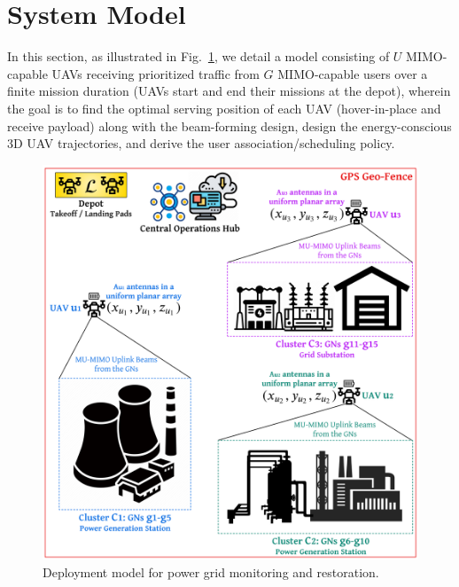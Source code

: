 \documentclass[10pt, twocolumn]{IEEEtran}
\begin{document}
\section{System Model}\label{S2}
In this section, as illustrated in Fig.~\ref{F1}, we detail a model consisting of $U$ MIMO-capable UAVs receiving prioritized traffic from $G$ MIMO-capable users over a finite mission duration (UAVs start and end their missions at the depot), wherein the goal is to find the optimal serving position of each UAV (hover-in-place and receive payload) along with the beam-forming design, design the energy-conscious $3$D UAV trajectories, and derive the user association/scheduling policy.
\begin{figure} [t]
    \centering
    \includegraphics[width=1.0\linewidth]{figs/deployment_model.png}
    \vspace{-6mm}
    \caption{Deployment model for power grid monitoring and restoration.}
    \vspace{-1.1mm}
    \label{F1}
\end{figure}
\end{document}
